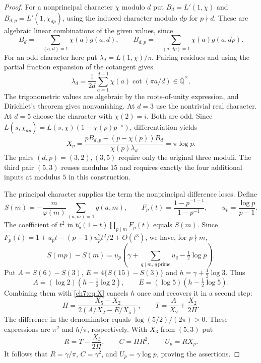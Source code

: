\documentclass[11pt,a4paper,oneside,openany]{report}
\theoremstyle{remark}\newtheorem{remark}[theorem]{Remark}
\numberwithin{equation}{section}
\newcommand{\A}{\overline{\mathbb Q}}\newcommand{\B}{\mathcal B}
\begin{document}
\begin{proof}
For a nonprincipal character $\chi$ modulo $d$ put $B_d=L'(1,\chi)$ and $B_{d,p}=L'(1,\chi_{dp})$, using the induced character modulo $dp$ for $p\nmid d$. These are algebraic linear combinations of the given values, since
\[
 B_d=-\sum_{(a,d)=1}\chi(a)g(a,d),\qquad
 B_{d,p}=-\sum_{(a,dp)=1}\chi(a)g(a,dp).
\]
For an odd character here put $\lambda_d=L(1,\chi)/\pi$. Pairing residues and using the partial fraction expansion of the cotangent gives
\[
 \lambda_d=\frac1{2d}\sum_{a=1}^{d-1}\chi(a)\cot(\pi a/d)\in\A^\times.
\]
The trigonometric values are algebraic by the roots-of-unity expression, and Dirichlet's theorem gives nonvanishing. At $d=3$ use the nontrivial real character. At $d=5$ choose the character with $\chi(2)=i$. Both are odd. Since $L(s,\chi_{dp})=L(s,\chi)(1-\chi(p)p^{-s})$, differentiation yields
\begin{equation}\label{ch7:eq:X}
 X_p=\frac{pB_{d,p}-(p-\chi(p))B_d}{\chi(p)\lambda_d}=\pi\log p.
\end{equation}
The pairs $(d,p)=(3,2),(3,5)$ require only the original three moduli. The third pair $(5,3)$ reuses modulus $15$ and requires exactly the four additional inputs at modulus $5$ in this construction.

The principal character supplies the term the nonprincipal difference loses. Define
\[
 S(m)=-\frac{m}{\varphi(m)}\sum_{(a,m)=1}g(a,m),\qquad
 F_p(t)=\frac{1-p^{-1-t}}{1-p^{-1}},\qquad u_p=\frac{\log p}{p-1}.
\]
The coefficient of $t^2$ in $t\zeta(1+t)\prod_{p\mid m}F_p(t)$ equals $S(m)$. Since $F_p(t)=1+u_pt-(p-1)u_p^2t^2/2+O(t^3)$, we have, for $p\nmid m$,
\[
 S(mp)-S(m)=u_p\left(\gamma+\sum_{q\mid m,\,q\ \mathrm{prime}}u_q-\tfrac12\log p\right).
\]
Put $A=S(6)-S(3)$, $E=4\{S(15)-S(3)\}$ and $h=\gamma+\tfrac12\log3$. Thus
\[
  A=(\log2)(h-\tfrac12\log2),\qquad E=(\log5)(h-\tfrac12\log5).
\]
Combining them with \eqref{ch7:eq:X} cancels $h$ once and recovers it in a second step:
\begin{equation}\label{ch7:eq:old}
 \Pi=\frac{X_5-X_2}{2(A/X_2-E/X_5)},\qquad T=\frac A{X_2}+\frac{X_2}{2\Pi}.
\end{equation}
The difference in the denominator equals $\log(5/2)/(2\pi)>0$. These expressions are $\pi^2$ and $h/\pi$, respectively. With $X_3$ from $(5,3)$ put
\begin{equation}\label{ch7:eq:final}
 R=T-\frac{X_3}{2\Pi},\qquad C=\Pi R^2,\qquad U_p=R X_p .
\end{equation}
It follows that $R=\gamma/\pi$, $C=\gamma^2$, and $U_p=\gamma\log p$, proving the assertions.\end{proof}
\end{document}
